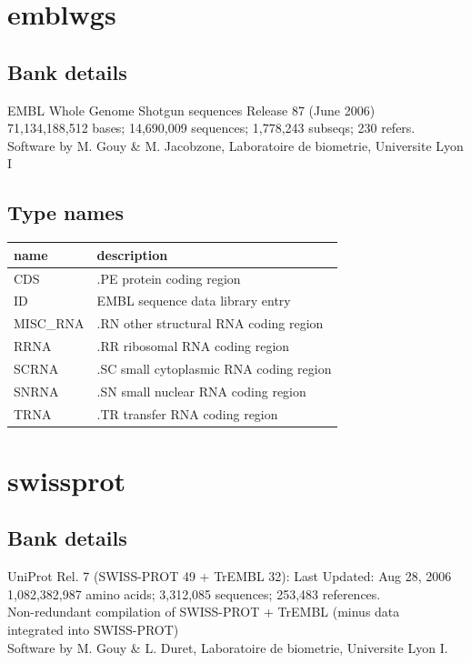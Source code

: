 \documentclass{article}
\begin{document}
\begin{Schunk}
\section{ emblwgs }
\subsection{Bank details}
EMBL Whole Genome Shotgun sequences Release 87  (June 2006)\\
71,134,188,512 bases; 14,690,009 sequences; 1,778,243 subseqs; 230 refers.\\
Software by M. Gouy \& M. Jacobzone, Laboratoire de biometrie, Universite Lyon I

\subsection{Type names}
\noindent\begin{tabular}{ll}
\hline \hline
name & description\\
\hline
CDS & .PE protein coding region \\
ID & EMBL sequence data library entry \\
MISC\_RNA & .RN other structural RNA coding region \\
RRNA & .RR ribosomal RNA coding region \\
SCRNA & .SC small cytoplasmic RNA coding region \\
SNRNA & .SN small nuclear RNA coding region \\
TRNA & .TR transfer RNA coding region \\
\hline \hline
\end{tabular}

\section{ swissprot }
\subsection{Bank details}
UniProt Rel. 7 (SWISS-PROT 49 + TrEMBL 32): Last Updated: Aug 28, 2006\\
1,082,382,987 amino acids; 3,312,085 sequences; 253,483 references.\\
Non-redundant compilation of SWISS-PROT + TrEMBL (minus  data\\
integrated  into  SWISS-PROT)\\
Software by M. Gouy \& L. Duret, Laboratoire de biometrie, Universite Lyon I.


\end{Schunk}
\end{document}
